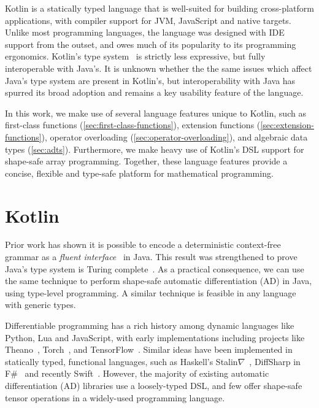 \documentclass[12pt,initial,twoside,maitrise]{dms}
\numberwithin{equation}{section}
\numberwithin{table}{chapter}
\numberwithin{figure}{chapter}
\begin{document}
Kotlin is a statically typed language that is well-suited for building cross-platform applications, with compiler support for JVM, JavaScript and native targets. Unlike most programming languages, the language was designed with IDE support from the outset, and owes much of its popularity to its programming ergonomics. Kotlin's type system~\citep{tate2013mixed} is strictly less expressive, but fully interoperable with Java's. It is unknown whether the the same issues which affect Java's type system are present in Kotlin's, but interoperability with Java has spurred its broad adoption and remains a key usability feature of the language.

In this work, we make use of several language features unique to Kotlin, such as first-class functions (\autoref{sec:first-class-functions}), extension functions (\autoref{sec:extension-functions}), operator overloading (\autoref{sec:operator-overloading}), and algebraic data types (\autoref{sec:adts}). Furthermore, we make heavy use of Kotlin's DSL support for shape-safe array programming. Together, these language features provide a concise, flexible and type-safe platform for mathematical programming.

\section{Kotlin\textorpdfstring{$\nabla$}}\label{sec:kotlingrad}

Prior work has shown it is possible to encode a deterministic context-free grammar as a \textit{fluent interface}~\citep{gil2016formal} in Java. This result was strengthened to prove Java's type system is Turing complete~\citep{Grigore:2017:JGT:3009837.3009871}. As a practical consequence, we can use the same technique to perform shape-safe automatic differentiation (AD) in Java, using type-level programming. A similar technique is feasible in any language with generic types.

Differentiable programming has a rich history among dynamic languages like Python, Lua and JavaScript, with early implementations including projects like Theano~\citep{theano}, Torch~\citep{collobert2002torch}, and TensorFlow~\citep{abadi2016tensorflow}. Similar ideas have been implemented in statically typed, functional languages, such as Haskell's Stalin$\nabla$~\citep{pearlmutter2008using}, DiffSharp in F\#~\citep{baydin-diffsharp} and recently Swift~\citep{swift}. However, the majority of existing automatic differentiation (AD) libraries use a loosely-typed DSL, and few offer shape-safe tensor operations in a widely-used programming language.
\end{document}
